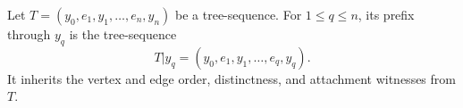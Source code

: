 \begin{definition}
Let $T=(y_0,e_1,y_1,\ldots,e_n,y_n)$ be a tree-sequence.  For
$1\leq q\leq n$, its prefix through $y_q$ is the tree-sequence
\[
  T|y_q=(y_0,e_1,y_1,\ldots,e_q,y_q).
\]
It inherits the vertex and edge order, distinctness, and attachment witnesses
from $T$.
\end{definition}
